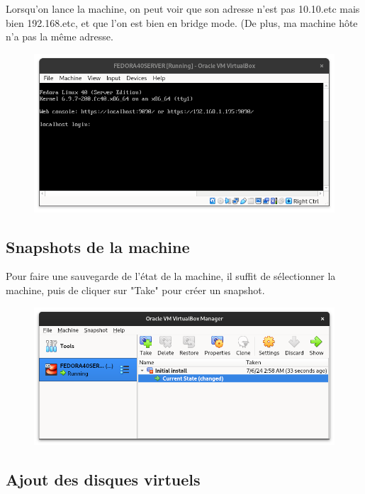 \documentclass{article}
\begin{document}
Lorsqu'on lance la machine, on peut voir que son adresse n'est pas 10.10.etc mais bien 192.168.etc, et que l'on est bien en bridge mode. (De plus, ma machine hôte n'a pas la même adresse.

\begin{figure}[h!]
		\centering
		\includegraphics[width=1\textwidth]{vbox18.png}
\end{figure}

\pagebreak

\subsection{Snapshots de la machine}

Pour faire une sauvegarde de l'état de la machine, il suffit de sélectionner la machine, puis de cliquer sur "Take" pour créer un snapshot.

\begin{figure}[h!]
		\centering
		\includegraphics[width=1\textwidth]{vbox19.png}
\end{figure}

\subsection{Ajout des disques virtuels}
\end{document}

